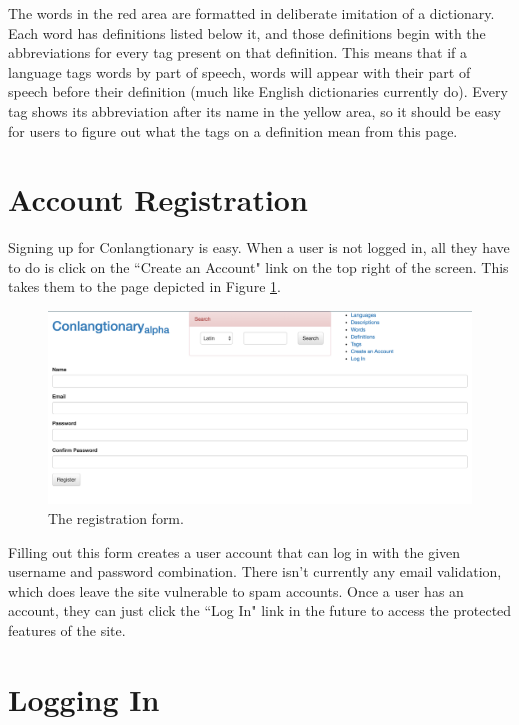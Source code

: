 The words in the red area are formatted in deliberate imitation of a dictionary. Each word has definitions listed below it, and those definitions begin with the abbreviations for every tag present on that definition. This means that if a language tags words by part of speech, words will appear with their part of speech before their definition (much like English dictionaries currently do). Every tag shows its abbreviation after its name in the yellow area, so it should be easy for users to figure out what the tags on a definition mean from this page.

\section{Account Registration}
\label{sec:account-registration}

Signing up for Conlangtionary is easy. When a user is not logged in, all they have to do is click on the ``Create an Account" link on the top right of the screen. This takes them to the page depicted in Figure \ref{fig:registration-form}. 

\begin{figure}[!h]
\includegraphics[width=\textwidth]{figures/registration-form}
\caption{The registration form.}
\centering
\label{fig:registration-form}
\end{figure}

Filling out this form creates a user account that can log in with the given username and password combination. There isn't currently any email validation, which does leave the site vulnerable to spam accounts. Once a user has an account, they can just click the ``Log In" link in the future to access the protected features of the site.

\section{Logging In}
\label{sec:logging-in}

